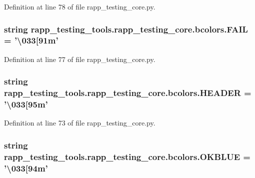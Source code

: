 Definition at line 78 of file rapp\-\_\-testing\-\_\-core.\-py.

\hypertarget{classrapp__testing__tools_1_1rapp__testing__core_1_1bcolors_a736e78318303a4d6c5a890ace95c53d1}{
\subsubsection[{F\-A\-I\-L}]{\setlength{\rightskip}{0pt plus 5cm}string rapp\-\_\-testing\-\_\-tools.\-rapp\-\_\-testing\-\_\-core.\-bcolors.\-F\-A\-I\-L = '\textbackslash{}033\mbox{[}91m'\hspace{0.3cm}{\ttfamily [static]}}}\label{classrapp__testing__tools_1_1rapp__testing__core_1_1bcolors_a736e78318303a4d6c5a890ace95c53d1}


Definition at line 77 of file rapp\-\_\-testing\-\_\-core.\-py.

\hypertarget{classrapp__testing__tools_1_1rapp__testing__core_1_1bcolors_af91464ab5d6d8c18702b08dd82149a8b}{
\subsubsection[{H\-E\-A\-D\-E\-R}]{\setlength{\rightskip}{0pt plus 5cm}string rapp\-\_\-testing\-\_\-tools.\-rapp\-\_\-testing\-\_\-core.\-bcolors.\-H\-E\-A\-D\-E\-R = '\textbackslash{}033\mbox{[}95m'\hspace{0.3cm}{\ttfamily [static]}}}\label{classrapp__testing__tools_1_1rapp__testing__core_1_1bcolors_af91464ab5d6d8c18702b08dd82149a8b}


Definition at line 73 of file rapp\-\_\-testing\-\_\-core.\-py.

\hypertarget{classrapp__testing__tools_1_1rapp__testing__core_1_1bcolors_a9c4c365e1b612bfa66f1f67920a97096}{
\subsubsection[{O\-K\-B\-L\-U\-E}]{\setlength{\rightskip}{0pt plus 5cm}string rapp\-\_\-testing\-\_\-tools.\-rapp\-\_\-testing\-\_\-core.\-bcolors.\-O\-K\-B\-L\-U\-E = '\textbackslash{}033\mbox{[}94m'\hspace{0.3cm}{\ttfamily [static]}}}\label{classrapp__testing__tools_1_1rapp__testing__core_1_1bcolors_a9c4c365e1b612bfa66f1f67920a97096}


